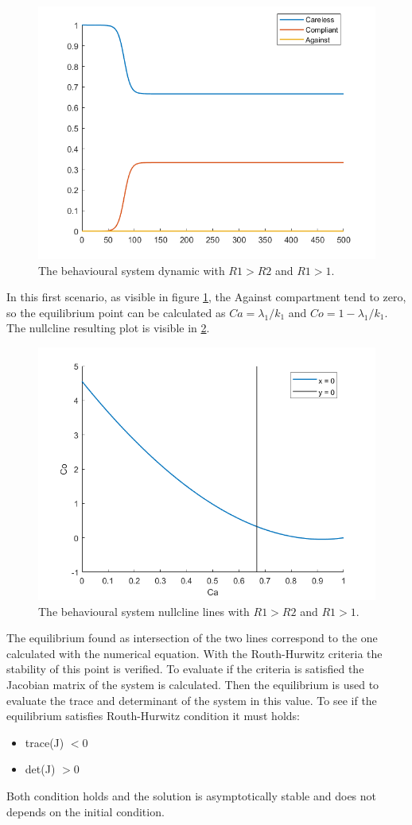 \begin{figure}[h]
	\centering
	\includegraphics[width=0.7\linewidth]{1_corpo/figure/behavioural_equilibrium/r1greater1_dyn}
	\caption[Behavioural dynamic first case]{The behavioural system dynamic with $R1 > R2$ and $R1 > 1$.}
	\label{fig:r1greater1dyn}
\end{figure}
In this first scenario, as visible in figure \ref{fig:r1greater1dyn}, the Against compartment tend to zero, so the equilibrium point can be calculated as $Ca = \lambda_1/k_1$ and $Co = 1 - \lambda_1/k_1 $. 
The nullcline resulting plot is visible in \ref{fig:r1greater1nullcline}. 
\begin{figure}[h]
	\centering
	\includegraphics[width=0.7\linewidth]{1_corpo/figure/behavioural_equilibrium/r1greater1_nullcline}
	\caption[Behavioural nullcline first case]{The behavioural system nullcline lines with $R1 > R2$ and $R1 > 1$.}
	\label{fig:r1greater1nullcline}
\end{figure}

The equilibrium found as intersection of the two lines correspond to the one calculated with the numerical equation. With the Routh-Hurwitz criteria the stability of this point is verified. To evaluate if the criteria is satisfied the Jacobian matrix of the system is calculated. Then the equilibrium is used to evaluate the trace and determinant of the system in this value. To see if the equilibrium satisfies Routh-Hurwitz condition it must holds:
\begin{itemize}
	\item trace(J) $< 0$
	\item det(J) $> 0$
\end{itemize}
Both condition holds and the solution is asymptotically stable and does not depends on the initial condition.

